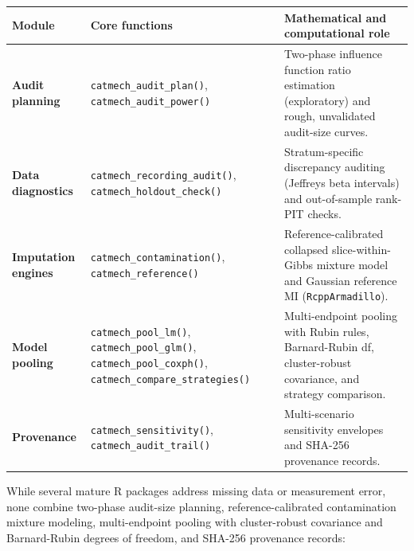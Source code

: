 \documentclass[
]{article}
\newcounter{none} %
\begin{document}
{\def\LTcaptype{none} %
\begin{longtable}[]{@{}
  >{\raggedright\arraybackslash}p{}
  >{\raggedright\arraybackslash}p{}
  >{\raggedright\arraybackslash}p{}@{}}
\toprule\noalign{}
\begin{minipage}[b]{\linewidth}\raggedright
Module
\end{minipage} & \begin{minipage}[b]{\linewidth}\raggedright
Core functions
\end{minipage} & \begin{minipage}[b]{\linewidth}\raggedright
Mathematical and computational role
\end{minipage} \\
\midrule\noalign{}
\endhead
\bottomrule\noalign{}
\endlastfoot
\textbf{Audit planning} & \texttt{catmech\_audit\_plan()},
\texttt{catmech\_audit\_power()} & Two-phase influence function ratio
estimation (exploratory) and rough, unvalidated audit-size curves. \\
\textbf{Data diagnostics} & \texttt{catmech\_recording\_audit()},
\texttt{catmech\_holdout\_check()} & Stratum-specific discrepancy
auditing (Jeffreys beta intervals) and out-of-sample rank-PIT checks. \\
\textbf{Imputation engines} & \texttt{catmech\_contamination()},
\texttt{catmech\_reference()} & Reference-calibrated collapsed
slice-within-Gibbs mixture model and Gaussian reference MI
(\texttt{RcppArmadillo}). \\
\textbf{Model pooling} & \texttt{catmech\_pool\_lm()},
\texttt{catmech\_pool\_glm()}, \texttt{catmech\_pool\_coxph()},
\texttt{catmech\_compare\_strategies()} & Multi-endpoint pooling with
Rubin rules, Barnard-Rubin df, cluster-robust covariance, and strategy
comparison. \\
\textbf{Provenance} & \texttt{catmech\_sensitivity()},
\texttt{catmech\_audit\_trail()} & Multi-scenario sensitivity envelopes
and SHA-256 provenance records. \\
\end{longtable}
}

While several mature R packages address missing data or measurement
error, none combine two-phase audit-size planning, reference-calibrated
contamination mixture modeling, multi-endpoint pooling with
cluster-robust covariance and Barnard-Rubin degrees of freedom, and
SHA-256 provenance records:
\end{document}
